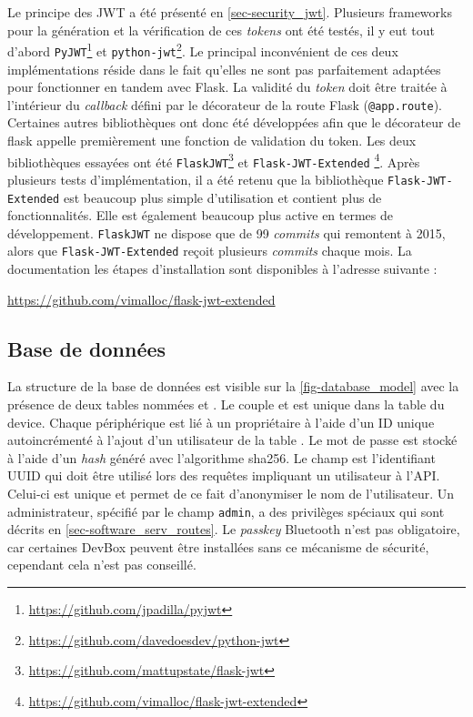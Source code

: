 Le principe des JWT a été présenté en \cref{sec-security_jwt}. Plusieurs frameworks pour la génération et la vérification de ces \textit{tokens} ont été testés, il y eut tout d'abord \texttt{PyJWT}\footnote{\url{https://github.com/jpadilla/pyjwt}} et \texttt{python-jwt}\footnote{\url{https://github.com/davedoesdev/python-jwt}}. Le principal inconvénient de ces deux implémentations réside dans le fait qu'elles ne sont pas parfaitement adaptées pour fonctionner en tandem avec Flask. La validité du \textit{token} doit être traitée à l'intérieur du \textit{callback} défini par le décorateur de la route Flask (\texttt{@app.route}). Certaines autres bibliothèques ont donc été développées afin que le décorateur de flask appelle premièrement une fonction de validation du token. Les deux bibliothèques essayées ont été \texttt{FlaskJWT}\footnote{\url{https://github.com/mattupstate/flask-jwt}} et \texttt{Flask-JWT-Extended} \footnote{\url{https://github.com/vimalloc/flask-jwt-extended}}. Après plusieurs tests d'implémentation, il a été retenu que la bibliothèque \texttt{Flask-JWT-Extended} est beaucoup plus simple d'utilisation et contient plus de fonctionnalités. Elle est également beaucoup plus active en termes de développement. \texttt{FlaskJWT} ne dispose que de 99 \textit{commits} qui remontent à 2015, alors que \texttt{Flask-JWT-Extended} reçoit plusieurs \textit{commits} chaque mois. La documentation les étapes d'installation sont disponibles à l'adresse suivante :

\begin{center}
    \url{https://github.com/vimalloc/flask-jwt-extended}
\end{center}



\subsection{Base de données}



La structure de la base de données est visible sur la \cref{fig-database_model} avec la présence de deux tables nommées  et . Le couple  et  est unique dans la table du device. Chaque périphérique est lié à un propriétaire à l'aide d'un ID unique autoincrémenté à l'ajout d'un utilisateur de la table . Le mot de passe est stocké à l'aide d'un \textit{hash} généré avec l'algorithme sha256. Le champ  est l'identifiant UUID qui doit être utilisé lors des requêtes impliquant un utilisateur à l'API. Celui-ci est unique et permet de ce fait d'anonymiser le nom de l'utilisateur. Un administrateur, spécifié par le champ \texttt{admin}, a des privilèges spéciaux qui sont décrits en \cref{sec-software_serv_routes}.
Le \textit{passkey} Bluetooth n'est pas obligatoire, car certaines DevBox peuvent être installées sans ce mécanisme de sécurité, cependant cela n'est pas conseillé. \\

